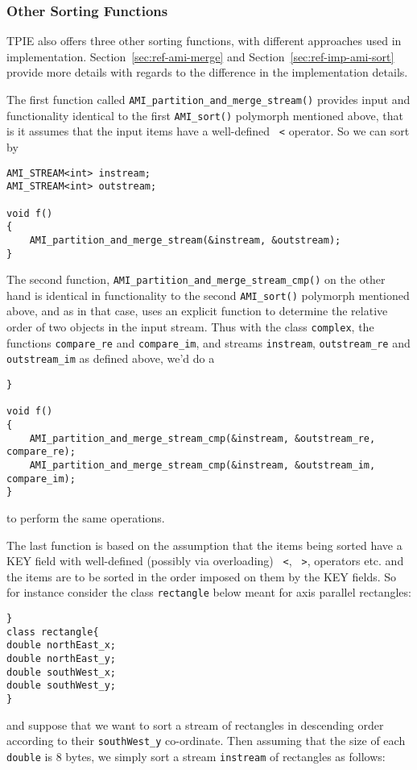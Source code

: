 \subsubsection{Other Sorting Functions}
TPIE also offers three other sorting functions, with different approaches used
in implementation. Section~\ref{sec:ref-ami-merge} and Section~\ref{sec:ref-imp-ami-sort}
provide more details with regards to the difference in the implementation details.

The first function called \verb|AMI_partition_and_merge_stream()| provides input
and functionality identical to the first \verb|AMI_sort()| polymorph mentioned above,
that is it assumes that the input items have a well-defined \verb| <| operator.
So we can sort by
\begin{verbatim}
AMI_STREAM<int> instream;
AMI_STREAM<int> outstream;

void f()
{
    AMI_partition_and_merge_stream(&instream, &outstream);
}
\end{verbatim}

The second function,  \verb|AMI_partition_and_merge_stream_cmp()|
on the other hand is identical in functionality to the second \verb|AMI_sort()| 
polymorph mentioned above, and as in that case, uses an explicit function to
determine the relative order of two objects in the input stream. Thus with 
the class \verb|complex|, the functions \verb|compare_re| and \verb|compare_im|,
and streams \verb|instream|, \verb|outstream_re| and \verb|outstream_im| as 
defined above, we'd do a 
\begin{verbatim}}

void f()
{
    AMI_partition_and_merge_stream_cmp(&instream, &outstream_re, compare_re);
    AMI_partition_and_merge_stream_cmp(&instream, &outstream_im, compare_im);
}
\end{verbatim}
to  perform the same operations.

The last function is based on the assumption that the items being sorted have 
a KEY field with  well-defined (possibly via overloading) \verb| <|, \verb| >|,
operators etc. and the items are to be sorted in the order imposed on them
by the KEY fields. So for instance consider the class \verb|rectangle|
below meant for axis parallel rectangles:
\begin{verbatim}}
class rectangle{
double northEast_x;
double northEast_y;
double southWest_x;
double southWest_y;
}
\end{verbatim}
and suppose that we want to sort a stream of rectangles in descending order according
to their \verb|southWest_y| co-ordinate. Then assuming that the size of each 
\verb|double| is 8 bytes, we simply sort a stream \verb|instream| of rectangles as
follows:
 

